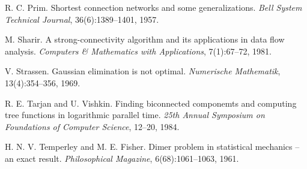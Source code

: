 \begin{thebibliography}{9}
  R. C. Prim.
  Shortest connection networks and some generalizations.
  \emph{Bell System Technical Journal}, 36(6):1389--1401, 1957.

  M. Sharir.
  A strong-connectivity algorithm and its applications in data flow analysis.
  \emph{Computers \& Mathematics with Applications}, 7(1):67--72, 1981.

  V. Strassen.
  Gaussian elimination is not optimal.
  \emph{Numerische Mathematik}, 13(4):354--356, 1969.

  R. E. Tarjan and U. Vishkin.
  Finding biconnected componemts and computing tree functions in logarithmic parallel time.
  \emph{25th Annual Symposium on Foundations of Computer Science}, 12--20, 1984.

  H. N. V. Temperley and M. E. Fisher.
  Dimer problem in statistical mechanics -- an exact result.
  \emph{Philosophical Magazine}, 6(68):1061--1063, 1961.

\end{thebibliography}